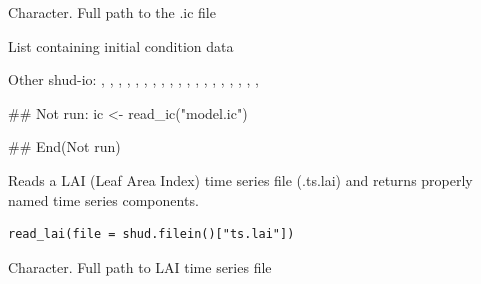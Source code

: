 \documentclass[a4paper]{book}
\begin{document}
%
\begin{Arguments}
\begin{ldescription}
\item[\code{file}] Character. Full path to the .ic file
\end{ldescription}
\end{Arguments}
%
\begin{Value}
List containing initial condition data
\end{Value}
%
\begin{SeeAlso}\relax
Other shud-io: 
,
,
,
,
,
,
,
,
,
,
,
,
,
,
,
,
,
,
,
\end{SeeAlso}
%
\begin{Examples}
\begin{ExampleCode}
## Not run: 
ic <- read_ic("model.ic")

## End(Not run)
\end{ExampleCode}
\end{Examples}
%
\begin{Description}\relax
Reads a LAI (Leaf Area Index) time series file (.ts.lai) and returns
properly named time series components.
\end{Description}
%
\begin{Usage}
\begin{verbatim}
read_lai(file = shud.filein()["ts.lai"])
\end{verbatim}
\end{Usage}
%
\begin{Arguments}
\begin{ldescription}
\item[\code{file}] Character. Full path to LAI time series file
\end{ldescription}
\end{Arguments}
\end{document}

